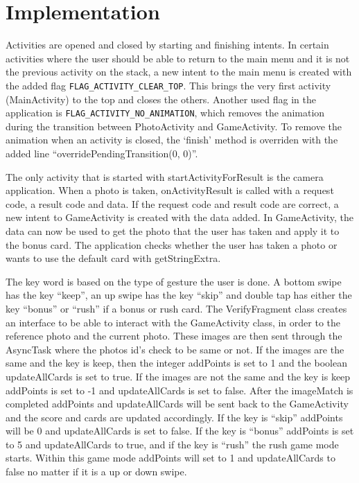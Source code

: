 \section{Implementation}
Activities are opened and closed by starting and finishing intents. In certain activities where the user should be able to return to the main menu and it is not the previous activity on the stack, a new intent to the main menu is created with the added flag \verb|FLAG_ACTIVITY_CLEAR_TOP|. This brings the very first activity (MainActivity) to the top and closes the others. Another used flag in the application is \verb|FLAG_ACTIVITY_NO_ANIMATION|, which removes the animation during the transition between PhotoActivity and GameActivity. To remove the animation when an activity is closed, the ‘finish’ method is overriden with the added line “overridePendingTransition(0, 0)”. \newline

The only activity that is started with startActivityForResult is the camera application. When a photo is taken, onActivityResult is called with a request code, a result code and data. If the request code and result code are correct, a new intent to GameActivity is created with the data added. In GameActivity, the data can now be used to get the photo that the user has taken and apply it to the bonus card. The application checks whether the user has taken a photo or wants to use the default card with getStringExtra. \newline

The key word is based on the type of gesture the user is done. A bottom swipe has the key “keep”, an up swipe has the key “skip” and double tap has either the key “bonus” or “rush” if a bonus or rush card.  The VerifyFragment class creates an interface to be able to interact with the GameActivity class, in order to the reference photo and the current photo. These images are then sent through the AsyncTask where the photos id’s check to be same or not.  If the images are the same and the key is keep, then the integer addPoints is set to 1 and the boolean updateAllCards is set to true. If the images are not the same and the key is keep addPoints is set to -1 and updateAllCards is set to false. After the imageMatch is completed addPoints and updateAllCards will be sent back to the GameActivity and the score and cards are updated accordingly. If the key is “skip” addPoints will be 0 and updateAllCards is set to false. If the key is “bonus” addPoints is set to 5 and updateAllCards to true, and if the key is “rush” the rush game mode starts. Within this game mode addPoints will set to 1 and updateAllCards to false no matter if it is a up or down swipe. \newline

